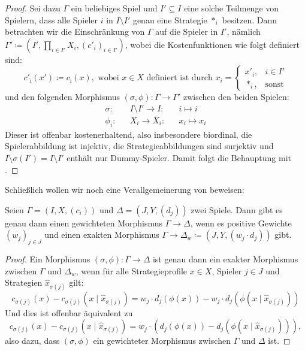 \begin{proof}
	Sei dazu $\Gamma$ ein beliebiges Spiel und $I' \subseteq I$ eine solche Teilmenge von Spielern, dass alle Spieler $i$ in $I \setminus I'$ genau eine Strategie $\ast_i$ besitzen. Dann betrachten wir die Einschränkung von $\Gamma$ auf die Spieler in $I'$, nämlich $\Gamma' \coloneqq (I', \prod_{i \in I'}X_i, (c'_i)_{i \in I'})$, wobei die Kostenfunktionen wie folgt definiert sind:
		\[c'_{\hat{\imath}}(x') \coloneqq c_{\hat{\imath}}(x), \text{ wobei $x \in X$ definiert ist durch } x_i = \begin{cases}x'_i, &i \in I'\\ \ast_i, &\text{sonst}\end{cases}\]
	und den folgenden Morphismus $(\sigma, \phi): \Gamma \to \Gamma'$ zwischen den beiden Spielen:
	\begin{align*}
		\sigma:	&&I\setminus I'	\to	 I:	&&i	\mapsto	i  \\
		\phi_i:	&&X_i	\to	 X_i:		&&x_i	\mapsto	x_i
	\end{align*}	
	Dieser ist offenbar kostenerhaltend, also insbesondere biordinal, die Spielerabbildung ist injektiv, die Strategieabbildungen sind surjektiv und $I\setminus \sigma(I') = I \setminus I'$ enthält nur Dummy-Spieler. Damit folgt die Behauptung mit .
\end{proof}

Schließlich wollen wir noch eine Verallgemeinerung von  beweisen:

\begin{lemma}
	Seien $\Gamma = (I, X, (c_i))$ und $\Delta = (J, Y, (d_j))$ zwei Spiele. Dann gibt es genau dann einen gewichteten Morphismus $\Gamma \to \Delta$, wenn es positive Gewichte $(w_j)_{j\in J}$ und einen exakten Morphismus $\Gamma \to \Delta_w \coloneqq (J, Y, (w_j\cdot d_j))$ gibt.
\end{lemma}

\begin{proof}
	Ein Morphismus $(\sigma, \phi): \Gamma \to \Delta$ ist genau dann ein exakter Morphismus zwischen $\Gamma$ und $\Delta_w$, wenn für alle Strategieprofile $x \in X$, Spieler $j \in J$ und Strategien $\hat{x}_{\sigma(j)}$ gilt:
		\[c_{\sigma(j)}(x) - c_{\sigma(j)}(x \mid \hat{x}_{\sigma(j)}) = w_j \cdot d_j(\phi(x)) - w_j \cdot d_j(\phi(x \mid \hat{x}_{\sigma(j)}))\]
	Und dies ist offenbar äquivalent zu
		\[c_{\sigma(j)}(x) - c_{\sigma(j)}(x \mid \hat{x}_{\sigma(j)}) = w_j \cdot \left(d_j(\phi(x)) - d_j(\phi(x \mid \hat{x}_{\sigma(j)}))\right),\]
	also dazu, dass $(\sigma, \phi)$ ein gewichteter Morphismus zwischen $\Gamma$ und $\Delta$ ist.
\end{proof}